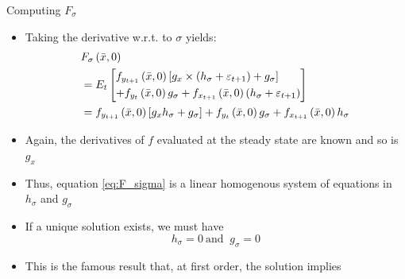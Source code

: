 \begin{frame}{Computing  $F_\sigma$}
  \begin{itemize}
    \item Taking the derivative w.r.t. to $\sigma$ yields:
          \begin{align}
             & {F_\sigma }\left( {\bar x,0} \right) \notag                                                                                                                                                                                                                               \\
             & = {E_t}\left[ \begin{gathered}
                                 {f_{{y_{t + 1}}}}\left( {\bar x,0} \right)\left[ {{g_x} \times \left( {{h_\sigma } + {\varepsilon _{t + 1}}} \right) + {g_\sigma }} \right] \hfill \\
                                 + {f_{{y_t}}}\left( {\bar x,0} \right){g_\sigma } + {f_{{x_{t + 1}}}}\left( {\bar x,0} \right)\left( {{h_\sigma } + {\varepsilon _{t + 1}}} \right) \hfill \\
                               \end{gathered}  \right]\notag \\
             & = {f_{{y_{t + 1}}}}\left( {\bar x,0} \right)\left[ {{g_x}{h_\sigma } + {g_\sigma }} \right] + {f_{{y_t}}}\left( {\bar x,0} \right){g_\sigma } + {f_{{x_{t + 1}}}}\left( {\bar x,0} \right){h_\sigma } \label{eq:F_sigma}
          \end{align}

    \item Again, the derivatives of $f$ evaluated at the steady state are known and so is $g_x$
    \item Thus, equation \eqref{eq:F_sigma} is a linear homogenous system of equations in $h_\sigma$ and $g_\sigma$
    \item If a unique solution exists, we must have
          \[
            {h_\sigma } = 0 \: \text{and } \: {g_\sigma } = 0
          \]
    \item This is the famous result that, at first order, the solution implies 
  \end{itemize}
\end{frame}

